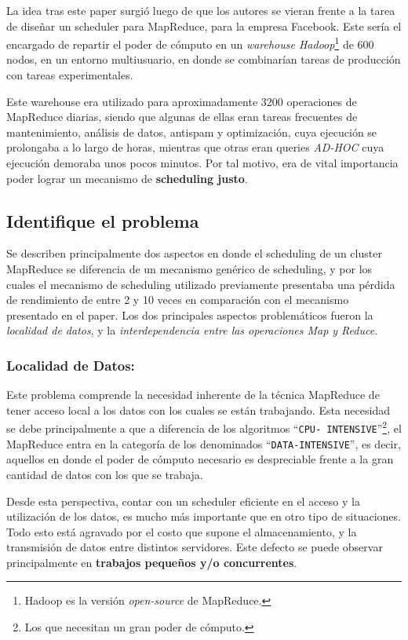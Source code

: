 \documentclass[11pt, a4paper, twoside]{article}
\begin{document}
La idea tras este paper surgió luego de que los autores se vieran frente a la
tarea de diseñar un scheduler para MapReduce, para la empresa Facebook. Este
sería el encargado de repartir el poder de cómputo en un \emph{warehouse
Hadoop}\footnote{Hadoop es la versión \emph{open-source} de MapReduce.} de 600
nodos, en un entorno multiusuario, en donde se combinarían tareas de producción
con tareas experimentales.

Este warehouse era utilizado para aproximadamente 3200 operaciones de MapReduce
diarias, siendo que algunas de ellas eran tareas frecuentes de mantenimiento,
análisis de datos, antispam y optimización, cuya ejecución se prolongaba a lo
largo de horas, mientras que otras eran queries \emph{AD-HOC} cuya ejecución
demoraba unos pocos minutos. Por tal motivo, era de vital importancia poder
lograr un mecanismo de \textbf{scheduling justo}.

\clearpage
\subsection {\footnotesize Identifique el problema}
\label{investigacion-2}

Se describen principalmente dos aspectos en donde el scheduling de un cluster
MapReduce se diferencia de un mecanismo genérico de scheduling, y por los cuales
el mecanismo de scheduling utilizado previamente presentaba una pérdida de
rendimiento de entre 2 y 10 veces en comparación con el mecanismo presentado en
el paper. Los dos principales aspectos problemáticos fueron la \emph{localidad
de datos}, y la \emph{interdependencia entre las operaciones Map y Reduce}.

\subsubsection{Localidad de Datos:}

Este problema comprende la necesidad inherente de la técnica MapReduce de tener
acceso local a los datos con los cuales se están trabajando. Esta necesidad se
debe principalmente a que a diferencia de los algoritmos ``\texttt{CPU-
INTENSIVE}''\footnote{Los que necesitan un gran poder de cómputo.}, el MapReduce
entra en la categoría de los denominados ``\texttt{DATA-INTENSIVE}'', es decir,
aquellos en donde el poder de cómputo necesario es despreciable frente a la gran
cantidad de datos con los que se trabaja.

Desde esta perspectiva, contar con un scheduler eficiente en el acceso y la
utilización de los datos, es mucho más importante que en otro tipo de
situaciones. Todo esto está agravado por el costo que supone el almacenamiento,
y la transmisión de datos entre distintos servidores. Este defecto se puede
observar principalmente en \textbf{trabajos pequeños y/o concurrentes}.
\end{document}
